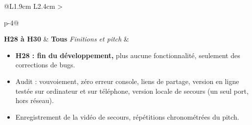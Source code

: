 \documentclass[11pt,a4paper]{article}
\begin{document}
\begin{longtable}{@{}L{1.9cm} L{2.4cm} >{\raggedright\arraybackslash}p{\dimexpr\textwidth-4.3cm-4\tabcolsep\relax}@{}}
  \textbf{H28 à H30}  &
  \textbf{Tous} \newline \emph{Finitions et pitch} &
  \begin{itemize}[leftmargin=*, nosep]
    \item \textbf{H28 : fin du développement,} plus aucune fonctionnalité, seulement des corrections de bugs.
    \item Audit : vouvoiement, zéro erreur console, liens de partage, version en ligne testée sur ordinateur et sur téléphone, version locale de secours (un seul port, hors réseau).
    \item Enregistrement de la vidéo de secours, répétitions chronométrées du pitch.
  \end{itemize} \\
\end{longtable}
\renewcommand{\arraystretch}{1.0}
\end{document}
